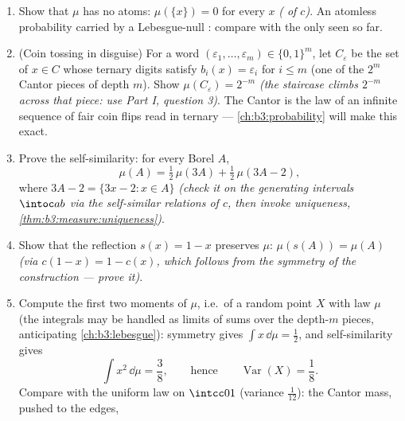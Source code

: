 \begin{problem}
\begin{enumerate}[resume]
        \[
        \mu(C) = 1, \qquad \lambda(C) = 0 :
        \]
        $\mu$ and $\lambda$ live on disjoint carriers ($C$ and
        its complement). Two  in this position are
        called \emph{mutually singular}, written $\mu \perp
        \lambda$.
  \item Show that $\mu$ has no atoms: $\mu(\{x\}) = 0$ for
        every $x$ \emph{( of $c$)}. An atomless
        probability  carried by a Lebesgue-null :
        compare with the only  seen so far.
  \item (Coin tossing in disguise) For a word $(\varepsilon_1,
        \dots, \varepsilon_m) \in \{0,1\}^m$, let
        $C_{\varepsilon}$ be the set of $x \in C$ whose ternary
        digits satisfy $b_i(x) = \varepsilon_i$ for $i \leq m$
        (one of the $2^m$ Cantor pieces of depth $m$). Show
        $\mu(C_\varepsilon) = 2^{-m}$ \emph{(the staircase
        climbs $2^{-m}$ across that piece: use Part I,
        question 3)}. The Cantor  is the law of an
        infinite sequence of fair coin flips read in ternary
        --- \cref{ch:b3:probability} will make this exact.
  \item Prove the self-similarity: for every Borel $A$,
        \[
        \mu(A) = \tfrac12\,\mu(3A) +
        \tfrac12\,\mu(3A - 2) ,
        \]
        where $3A - 2 = \{3x - 2 : x \in A\}$ \emph{(check it
        on the generating intervals $\intoc ab$ via the
        self-similar relations of $c$, then invoke uniqueness,
        \cref{thm:b3:measure:uniqueness})}.
  \item Show that the reflection $s(x) = 1 - x$ preserves
        $\mu$: $\mu(s(A)) = \mu(A)$ \emph{(via $c(1 - x) = 1 -
        c(x)$, which follows from the symmetry of the
        construction --- prove it)}.
  \item Compute the first two moments of $\mu$, i.e.\ of a
        random point $X$ with law $\mu$ (the integrals may be
        handled as limits of sums over the depth-$m$ pieces,
        anticipating \cref{ch:b3:lebesgue}): symmetry gives
        $\int x\,\dd\mu = \frac12$, and self-similarity gives
        \[
        \int x^2\,\dd\mu = \frac38,
        \qquad\text{hence}\qquad
        \operatorname{Var}(X) = \frac18 .
        \]
        Compare with the uniform law on $\intcc01$ (variance
        $\frac1{12}$): the Cantor mass, pushed to the edges,

\end{enumerate}
\end{problem}
